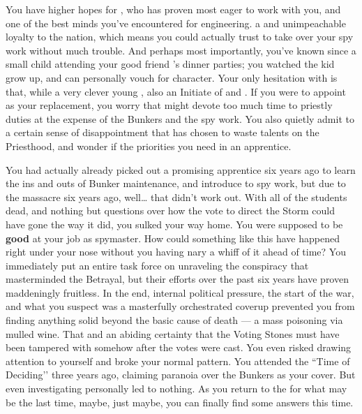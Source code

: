 \documentclass[char]{GL2020}
\begin{document}
You have higher hopes for \cInitiate{}, who has proven most eager to work with you, and \cInitiate{\theyhave} one of the best minds you've encountered for engineering. \cInitiate{\Theyare} a \pShippie{} and \cInitiate{\have} unimpeachable loyalty to the nation, which means you could actually trust \cInitiate{\them} to take over your spy work without much trouble. And perhaps most importantly, you’ve known \cInitiate{} since \cInitiate{\theywere} a small child attending your good friend \cHeadDiplomat{\intro}’s dinner parties; you watched the kid grow up, and can personally vouch for \cInitiate{\their} character. Your only hesitation with \cInitiate{} is that, while \cInitiate{\theyare} a very clever young \cInitiate{\person}, \cInitiate{\theyare} also an Initiate of \cEbb{} and \cFlow{}. If you were to appoint \cInitiate{\them} as your replacement, you worry that \cInitiate{\they} might devote too much time to \cInitiate{\their} priestly duties at the expense of the Bunkers and the spy work. You also quietly admit to a certain sense of disappointment that \cInitiate{\theyhave} has chosen to waste \cInitiate{\their} talents on the Priesthood, and wonder if \cInitiate{\theyhave} the priorities you need in an apprentice.

You had actually already picked out a promising apprentice six years ago to learn the ins and outs of Bunker maintenance, and introduce to spy work, but due to the massacre six years ago, well\ldots{} that didn't work out. With all of the students dead, and nothing but questions over how the vote to direct the Storm could have gone the way it did, you sulked your way home. You were supposed to be \textbf{good} at your job as spymaster. How could something like this have happened right under your nose without you having nary a whiff of it ahead of time? You immediately put an entire task force on unraveling the conspiracy that masterminded the Betrayal, but their efforts over the past six years have proven maddeningly fruitless. In the end, internal political pressure, the start of the war, and what you suspect was a masterfully orchestrated coverup prevented you from finding anything solid beyond the basic cause of death — a mass poisoning via mulled wine. That and an abiding certainty that the Voting Stones must have been tampered with somehow after the votes were cast. You even risked drawing attention to yourself and broke your normal pattern. You attended the ``Time of Deciding’’ three years ago, claiming paranoia over the Bunkers as your cover. But even investigating personally led to nothing. As you return to the \pSchool{} for what may be the last time, maybe, just maybe, you can finally find some answers this time.
\end{document}

